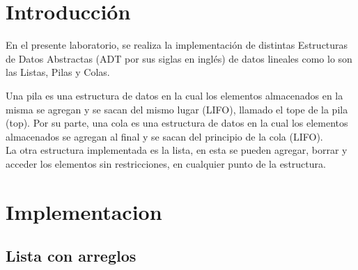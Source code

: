 \documentclass[11pt]{article}
\begin{document}
\section{Introducción}
En el presente laboratorio, se realiza la implementación de distintas Estructuras de Datos Abstractas (ADT por sus siglas en inglés) de datos lineales como lo son las Listas, Pilas y Colas.

Una pila es una estructura de datos en la cual los elementos almacenados en la misma se agregan y se sacan del mismo lugar (LIFO), llamado el tope de la pila (top). Por su parte, una cola es una estructura de datos en la cual los elementos almacenados se agregan al final y se sacan del principio de la cola (LIFO). 
\\La otra estructura implementada es la lista, en esta se pueden agregar, borrar y acceder los elementos sin restricciones, en cualquier punto de la estructura.\cite{Exp}

\newpage
\section{Implementacion}
\subsection{Lista con arreglos}
\end{document}

